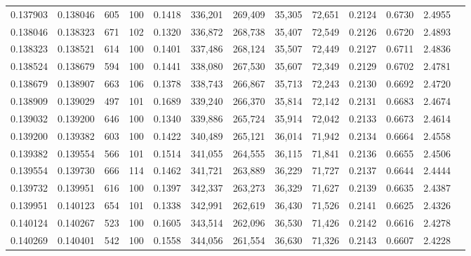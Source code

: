 \begin{tabular}{rrrrrrrrrrrrr}
0.137903 & 0.138046 &   605 & 100 &                                     0.1418 & 336,201 & 269,409 &  35,305 &  72,651 & 0.2124 & 0.6730 & 2.4955 \\
0.138046 & 0.138323 &   671 & 102 &                                     0.1320 & 336,872 & 268,738 &  35,407 &  72,549 & 0.2126 & 0.6720 & 2.4893 \\
0.138323 & 0.138521 &   614 & 100 &                                     0.1401 & 337,486 & 268,124 &  35,507 &  72,449 & 0.2127 & 0.6711 & 2.4836 \\
0.138524 & 0.138679 &   594 & 100 &                                     0.1441 & 338,080 & 267,530 &  35,607 &  72,349 & 0.2129 & 0.6702 & 2.4781 \\
0.138679 & 0.138907 &   663 & 106 &                                     0.1378 & 338,743 & 266,867 &  35,713 &  72,243 & 0.2130 & 0.6692 & 2.4720 \\
0.138909 & 0.139029 &   497 & 101 &                                     0.1689 & 339,240 & 266,370 &  35,814 &  72,142 & 0.2131 & 0.6683 & 2.4674 \\
0.139032 & 0.139200 &   646 & 100 &                                     0.1340 & 339,886 & 265,724 &  35,914 &  72,042 & 0.2133 & 0.6673 & 2.4614 \\
0.139200 & 0.139382 &   603 & 100 &                                     0.1422 & 340,489 & 265,121 &  36,014 &  71,942 & 0.2134 & 0.6664 & 2.4558 \\
0.139382 & 0.139554 &   566 & 101 &                                     0.1514 & 341,055 & 264,555 &  36,115 &  71,841 & 0.2136 & 0.6655 & 2.4506 \\
0.139554 & 0.139730 &   666 & 114 &                                     0.1462 & 341,721 & 263,889 &  36,229 &  71,727 & 0.2137 & 0.6644 & 2.4444 \\
0.139732 & 0.139951 &   616 & 100 &                                     0.1397 & 342,337 & 263,273 &  36,329 &  71,627 & 0.2139 & 0.6635 & 2.4387 \\
0.139951 & 0.140123 &   654 & 101 &                                     0.1338 & 342,991 & 262,619 &  36,430 &  71,526 & 0.2141 & 0.6625 & 2.4326 \\
0.140124 & 0.140267 &   523 & 100 &                                     0.1605 & 343,514 & 262,096 &  36,530 &  71,426 & 0.2142 & 0.6616 & 2.4278 \\
0.140269 & 0.140401 &   542 & 100 &                                     0.1558 & 344,056 & 261,554 &  36,630 &  71,326 & 0.2143 & 0.6607 & 2.4228 \\

\end{tabular}
